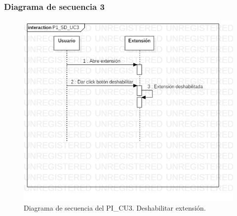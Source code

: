 \documentclass[12pt, a4paper, titlepage]{report}
\begin{document}
			    \subsubsection{Diagrama de secuencia 3}
			    \begin{figure}[H]
				    \begin{center} \includegraphics[width=15cm]{./imagenes/Desarrollo/Prototipo_1/P1_SD_UC3.png}
				    \caption[Diagrama de secuencia 3 del Prototipo I]{Diagrama de secuencia del PI\_CU3. Deshabilitar extensión.}
			        \end{center}
			    \end{figure}
\end{document}
